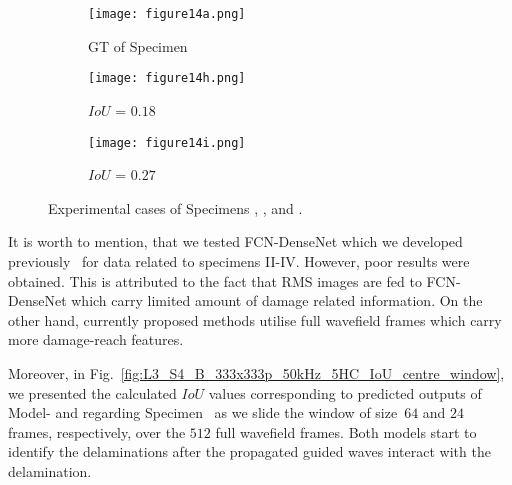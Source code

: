 \begin{figure} [!h]
	\par\medskip
	\begin{subfigure}[b]{0.32\textwidth}
		\centering
		\texttt{[image: figure14a.png]}
		\caption{GT of Specimen~}
		\label{fig:gt_specimen_4}
	\end{subfigure}
	\hfill
	\begin{subfigure}[b]{0.32\textwidth}
		\centering
		\texttt{[image: figure14h.png]}
		\caption{\(IoU\) = \(0.18\)}  
		\label{fig:L3_S4_B_saeed}
	\end{subfigure}
	\hfill
	\begin{subfigure}[b]{0.32\textwidth}
		\centering
		\texttt{[image: figure14i.png]}
		\caption{\(IoU\) = \(0.27\)} 
		\label{fig:L3_S4_B_ijjeh}
	\end{subfigure}
	\caption{Experimental cases of Specimens , , and .}
	\label{fig:exp_case}
\end{figure} 

It is worth to mention, that we tested FCN-DenseNet which we developed previously~\cite{Ijjeh2021} for data related to specimens II-IV. 
However, poor results were obtained. 
This is attributed to the fact that RMS images are fed to FCN-DenseNet which carry limited amount of damage related information. 
On the other hand, currently proposed methods utilise full wavefield frames which carry more damage-reach features. 

Moreover, in Fig.~\ref{fig:L3_S4_B_333x333p_50kHz_5HC_IoU_centre_window}, we presented the calculated \(IoU\) values corresponding to predicted outputs of Model- and  regarding Specimen~ as we slide the window of size~\(64\) and \(24\) frames, respectively, over the \(512\) full wavefield frames.
Both models start to identify the delaminations after the propagated guided waves interact with the delamination.

